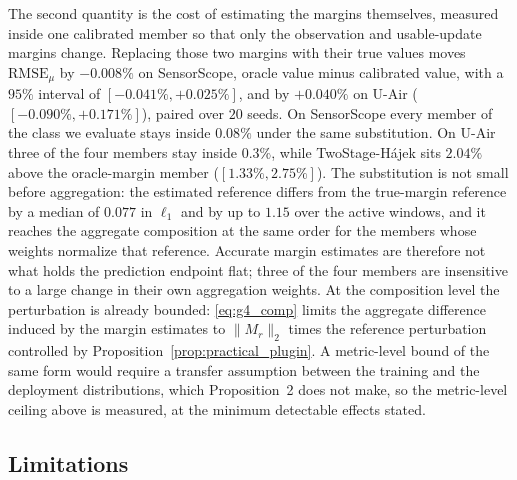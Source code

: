 \documentclass[letterpaper,journal]{IEEEtran}
\begin{document}
The second quantity is the cost of estimating the margins themselves, measured
inside one calibrated member so that only the observation and usable-update
margins change.  Replacing those two margins with their true values moves
$\mathrm{RMSE}_{\mu}$ by $-0.008\%$ on SensorScope, oracle value minus calibrated
value, with a $95\%$ interval of $[-0.041\%,+0.025\%]$, and by $+0.040\%$ on
U-Air ($[-0.090\%,+0.171\%]$), paired over $20$ seeds.  On SensorScope every
member of the class we evaluate stays inside $0.08\%$ under the same
substitution.  On U-Air three of the four members stay inside $0.3\%$, while
TwoStage-H\'ajek sits $2.04\%$ above the oracle-margin member
($[1.33\%,2.75\%]$).  The substitution is not small before aggregation: the
estimated reference differs from the true-margin reference by a median of
$0.077$ in $\ell_1$ and by up to $1.15$ over the active windows, and it reaches
the aggregate composition at the same order for the members whose weights
normalize that reference.  Accurate margin estimates are therefore not what
holds the prediction endpoint flat; three of the four members are insensitive to
a large change in their own aggregation weights.
At the composition level the perturbation is already bounded: \eqref{eq:g4_comp}
limits the aggregate difference induced by the margin estimates to $\|M_r\|_2$
times the reference perturbation controlled by
Proposition~\ref{prop:practical_plugin}.  A metric-level bound of the same form
would require a transfer assumption between the training and the deployment
distributions, which Proposition~2 does not make, so the metric-level ceiling
above is measured, at the minimum detectable effects stated.

\subsection{Limitations}
\label{subsec:limitations}
\end{document}
